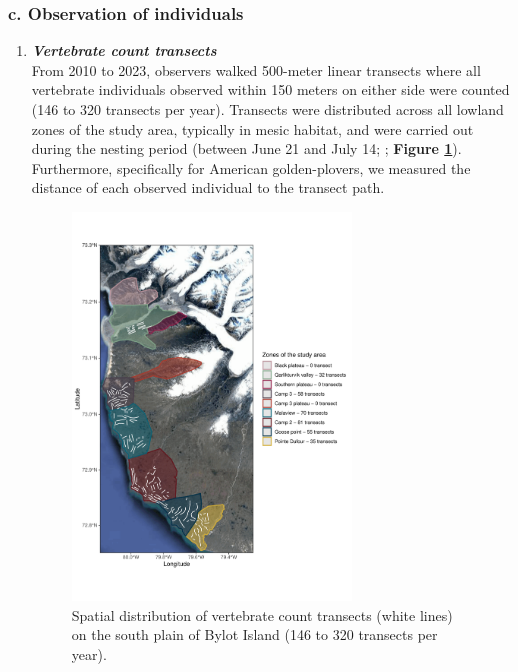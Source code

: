 \documentclass[a4paper,twoside,12pt]{article}
\begin{document}
\subsubsection*{c. Observation of individuals}
\begin{enumerate}[label=\roman*]
\item[] \textit{\textbf{Vertebrate count transects}}\\
From 2010 to 2023, observers walked 500-meter linear transects where all vertebrate individuals observed within 150 meters on either side were counted (146 to 320 transects per year). Transects were distributed across all lowland zones of the study area, typically in mesic habitat, and were carried out during the nesting period (between June 21 and July 14; \citet{duchesne2021}; \textbf{Figure \ref{figure:transects}}). Furthermore, specifically for American golden-plovers, we measured the distance of each observed individual to the transect path.
\\
\begin{figure}
\centering
  \includegraphics[width=0.7\textwidth, angle=0]{figures/transects.pdf}
  \vspace{-35pt} %
  \caption{Spatial distribution of vertebrate count transects (white lines) on the south plain of Bylot Island (146 to 320 transects per year).}
 \label{figure:transects}
\end{figure}
\newpage


\end{enumerate}
\end{document}
